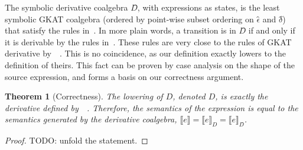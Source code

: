 \documentclass[conference]{IEEEtran}
\newtheorem{theorem}{Theorem}
\begin{document}
The symbolic derivative coalgebra \(D̂\), with expressions as states, is the least symbolic GKAT coalgebra (ordered by point-wise subset ordering on \(ϵ̂\) and \(δ̂\)) that satisfy the rules in~.
In more plain words, a transition is in \(D̂\) if and only if it is derivable by the rules in~.
These rules are very close to the rules of GKAT derivative by~\citeauthor{schmid_GuardedKleeneAlgebra_2021}~\cite{schmid_GuardedKleeneAlgebra_2021}.
This is no coincidence, as our definition exactly lowers to the definition of theirs.
This fact can be proven by case analysis on the shape of the source expression, and forms a basis on our correctness argument.
\begin{theorem}[Correctness]\label{thm:derivative-correctness}
    The lowering of \(D̂\), denoted \(D\), is exactly the derivative defined by~\citeauthor{schmid_GuardedKleeneAlgebra_2021}~\cite{schmid_GuardedKleeneAlgebra_2021}.
    Therefore, the semantics of the expression is equal to the semantics generated by the derivative coalgebra, \(⟦e⟧ = ⟦e⟧_{D} = ⟦e⟧_{D̂}\).
\end{theorem}
\begin{proof}
    TODO: unfold the statement.
\end{proof}
\end{document}
